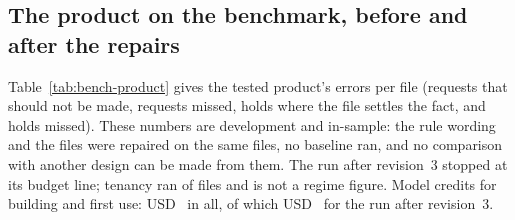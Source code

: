 \subsection{The product on the benchmark, before and after the repairs}
\label{supp:bench-product}

Table~\ref{tab:bench-product} gives the tested product's errors per file (requests that should not be made, requests missed, holds where the file settles the fact, and holds missed). These numbers are development and in-sample: the rule wording and the files were repaired on the same files, no baseline ran, and no comparison with another design can be made from them. The run after revision~3 stopped at its budget line; tenancy ran \sfourdevRevThreeTenFilesRun{} of \sfourdevRevThreeTenFilesInSet{} files and is not a regime figure. Model credits for building and first use: USD~\sfourdevStepTwoSpend{} in all, of which USD~\sfourdevRevThreeSpend{} for the run after revision~3.


